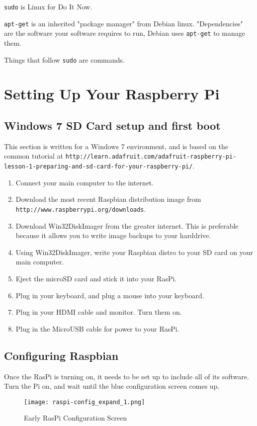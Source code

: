 \texttt{sudo} is Linux for Do It Now.

\texttt{apt-get} is an inherited "package manager" from Debian linux. "Dependencies" are the software your software requires to run, Debian uses \texttt{apt-get} to manage them.

Things that follow \texttt{sudo} are commands.

\section{Setting Up Your Raspberry Pi}
\subsection{Windows 7 SD Card setup and first boot}
This section is written for a Windows 7 environment, and is based on the common tutorial at \texttt{http://learn.adafruit.com/adafruit-raspberry-pi-lesson-1-preparing-and-sd-card-for-your-raspberry-pi/}. 

\begin{enumerate}
\item Connect your main computer to the internet.
\item Download the most recent Raspbian distribution image from \texttt{http://www.raspberrypi.org/downloads}.
\item Download Win32DiskImager from the greater internet. This is preferable because it allows you to write image backups to your harddrive.
\item Using Win32DiskImager, write your Raspbian distro to your SD card on your main computer.
\item Eject the microSD card and stick it into your RasPi.
\item Plug in your keyboard, and plug a mouse into your keyboard.
\item Plug in your HDMI cable and monitor. Turn them on.
\item Plug in the MicroUSB cable for power to your RasPi.
\end{enumerate}

\subsection{Configuring Raspbian}

Once the RasPi is turning on, it needs to be set up to include all of its software. Turn the Pi on, and wait until the blue configuration screen comes up.

\begin{figure}[h!]
  \caption{Early RasPi Configuration Screen}
  \centering
    \texttt{[image: raspi-config\_expand\_1.png]}
\end{figure}

